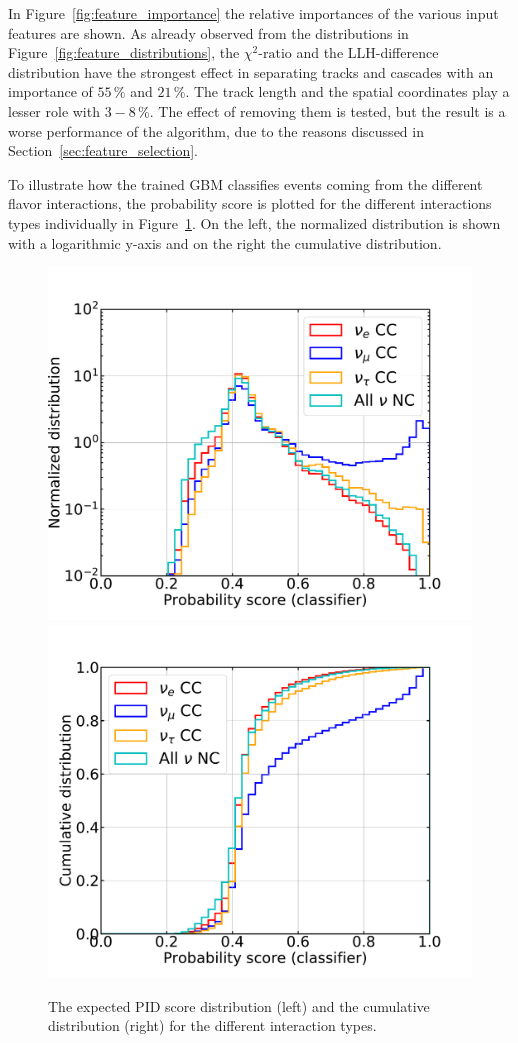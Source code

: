 In Figure~\ref{fig:feature_importance} the relative importances of the various input features are shown.
As already observed from the distributions in Figure~\ref{fig:feature_distributions}, the $\chi^2\textrm{-ratio}$ and the LLH-difference distribution have the strongest effect in separating tracks and cascades with an importance of $55$\,\% and $21$\,\%.
The track length and the spatial coordinates play a lesser role with $3-8$\,\%.
The effect of removing them is tested, but the result is a worse performance of the algorithm, due to the reasons discussed in Section~\ref{sec:feature_selection}.

To illustrate how the trained GBM classifies events coming from the different flavor interactions, the probability score is plotted for the different interactions types individually in Figure~\ref{fig:gbc_probability_flavors}.
On the left, the normalized distribution is shown with a logarithmic y-axis and on the right the cumulative distribution.
\begin{figure}[h]
	\centering
    \includegraphics[width=0.49\linewidth]{figures/bdt_score_normalized.pdf}
    \includegraphics[width=0.49\linewidth]{figures/bdt_score_cumulative.pdf}
    \caption[Expected PID score distribution and the cumulative distribution for the different interaction types]
    {The expected PID score distribution (left) and the cumulative distribution (right) for the different interaction types.}
    \label{fig:gbc_probability_flavors}
\end{figure}
